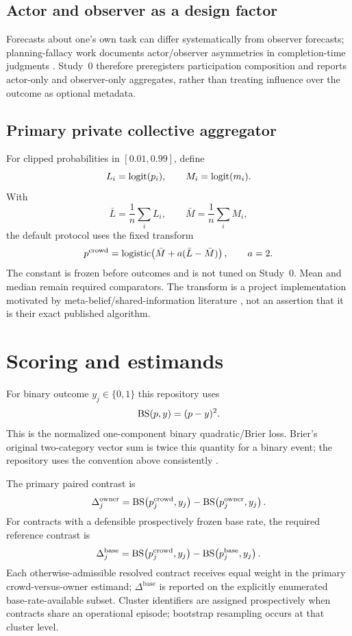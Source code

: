\subsection{Actor and observer as a design factor}
Forecasts about one's own task can differ systematically from observer forecasts; planning-fallacy work documents actor/observer asymmetries in completion-time judgments \citep{buehler1994}. Study~0 therefore preregisters participation composition and reports actor-only and observer-only aggregates, rather than treating influence over the outcome as optional metadata.

\subsection{Primary private collective aggregator}
For clipped probabilities in $[0.01,0.99]$, define
\[
L_i=\operatorname{logit}(p_i),\qquad M_i=\operatorname{logit}(m_i).
\]
With
\[
\bar L=\frac1n\sum_iL_i,\qquad
\bar M=\frac1n\sum_iM_i,
\]
the default protocol uses the fixed transform
\[
p^{\mathrm{crowd}}=\operatorname{logistic}\!\left(\bar M+a(\bar L-\bar M)\right),\qquad a=2.
\]
The constant is frozen before outcomes and is not tuned on Study~0. Mean and median remain required comparators. The transform is a project implementation motivated by meta-belief/shared-information literature \citep{palley2019,peker2025}, not an assertion that it is their exact published algorithm.

\section{Scoring and estimands}
For binary outcome $y_j\in\{0,1\}$ this repository uses
\[
\mathrm{BS}(p,y)=(p-y)^2.
\]
This is the normalized one-component binary quadratic/Brier loss. Brier's original two-category vector sum is twice this quantity for a binary event; the repository uses the convention above consistently \citep{brier1950,gneiting2007}.

The primary paired contrast is
\[
\Delta_j^{\mathrm{owner}}
=
\mathrm{BS}\!\left(p_j^{\mathrm{crowd}},y_j\right)
-
\mathrm{BS}\!\left(p_j^{\mathrm{owner}},y_j\right).
\]
For contracts with a defensible prospectively frozen base rate, the required reference contrast is
\[
\Delta_j^{\mathrm{base}}
=
\mathrm{BS}\!\left(p_j^{\mathrm{crowd}},y_j\right)
-
\mathrm{BS}\!\left(p_j^{\mathrm{base}},y_j\right).
\]
Each otherwise-admissible resolved contract receives equal weight in the primary crowd-versus-owner estimand; $\Delta^{\mathrm{base}}$ is reported on the explicitly enumerated base-rate-available subset. Cluster identifiers are assigned prospectively when contracts share an operational episode; bootstrap resampling occurs at that cluster level.

